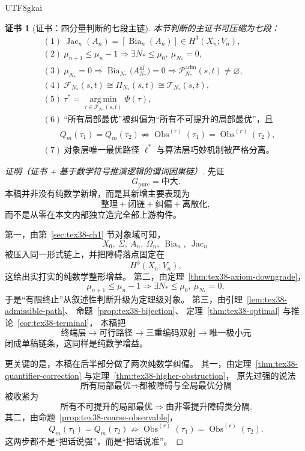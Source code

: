 \documentclass[12pt]{article}
\newtheorem{Certificate}{证书}[section]
\newcommand{\Bia}{\operatorname{Bia}}
\newcommand{\Jac}{\operatorname{Jac}}
\newcommand{\Obs}{\operatorname{Obs}}
\begin{document}
\begin{CJK*}{UTF8}{gkai}
\begin{Certificate}[证书：四分量判断的七段主链]
\label{cert:tex38-fourcomp-judgement}
本节判断的主证书可压缩为七段：
\[
\begin{aligned}
  &(1)\ \Jac_n(A_n)=[\Bia_n(A_n)]\in H^3(X_n;V_n),\\
  &(2)\ \mu_{n+1}\le \mu_n-1
  \Rightarrow
  \exists N_\ast\le \mu_0,\ \mu_{N_\ast}=0,\\
  &(3)\ \mu_{N_\ast}=0
  \Rightarrow
  \Bia_{N_\ast}\bigl(A_{N_\ast}^{\mathrm{nf}}\bigr)=0
  \Rightarrow
  \mathcal P^{\mathrm{adm}}_{N_\ast}(s,t)\neq\varnothing,\\
  &(4)\ \mathcal F_{N_\ast}(s,t)
  \cong
  \Pi_{N_\ast}(s,t)
  \cong
  \mathcal T_{N_\ast}(s,t),\\
  &(5)\ \tau^\ast
  =
  \operatorname*{arg\,min}_{\tau\in\mathcal T_{N_\ast}(s,t)}
  \Phi(\tau),\\
  &(6)\ \text{“所有局部最优”被纠偏为“所有不可提升的局部最优”，且 }\\
  &\qquad
  Q_m(\tau_1)=Q_m(\tau_2)
  \not\Rightarrow
  \Obs^{(r)}(\tau_1)=\Obs^{(r)}(\tau_2),\\
  &(7)\ \text{对象层唯一最优路径 }\ell^\ast
  \text{ 与算法层巧妙机制被严格分离。}
\end{aligned}
\]
\end{Certificate}

\begin{proof}[证明（证书 + 基于数学符号推演逻辑的谓词因果链）]
先证
\[
  G_{\mathrm{pure}}=\text{中大}.
\]
本稿并非没有纯数学新增，而是其新增主要表现为
\[
  \text{整理}
  +
  \text{闭链}
  +
  \text{纠偏}
  +
  \text{离散化},
\]
而不是从零在本文内部独立造完全部上游构件。

第一，由第~\ref{sec:tex38-ch1} 节对象域可知，
\[
  X_0,\ \Sigma,\ A_n,\ \Omega_n,\ \Bia_n,\ \Jac_n
\]
被压入同一形式链上，并把障碍落点固定在
\[
  H^3(X_n;V_n),
\]
这给出实打实的纯数学整形增益。
第二，由定理~\ref{thm:tex38-axiom-downgrade}，
\[
  \mu_{n+1}\le \mu_n-1
  \Rightarrow
  \exists N_\ast\le \mu_0,\ \mu_{N_\ast}=0,
\]
于是“有限终止”从叙述性判断升级为定理级对象。
第三，由引理~\ref{lem:tex38-admissible-path}、
命题~\ref{prop:tex38-bijection}、
定理~\ref{thm:tex38-optimal} 与推论~\ref{cor:tex38-terminal}，
本稿把
\[
  \text{终端层}
  \to
  \text{可行路径}
  \to
  \text{三重编码双射}
  \to
  \text{唯一极小元}
\]
闭成单稿链条，这同样是纯数学增益。

更关键的是，本稿在后半部分做了两次纯数学纠偏。
其一，由定理~\ref{thm:tex38-quantifier-correction} 与定理~\ref{thm:tex38-higher-obstruction}，
原先过强的说法
\[
  \text{所有局部最优}
  \Rightarrow
  \text{都被障碍与全局最优分隔}
\]
被收紧为
\[
  \text{所有不可提升的局部最优}
  \Rightarrow
  \text{由非零提升障碍类分隔}.
\]
其二，由命题~\ref{prop:tex38-coarse-observable}，
\[
  Q_m(\tau_1)=Q_m(\tau_2)
  \not\Rightarrow
  \Obs^{(r)}(\tau_1)=\Obs^{(r)}(\tau_2).
\]
这两步都不是“把话说强”，而是“把话说准”。


\end{proof}
\end{CJK*}
\end{document}
